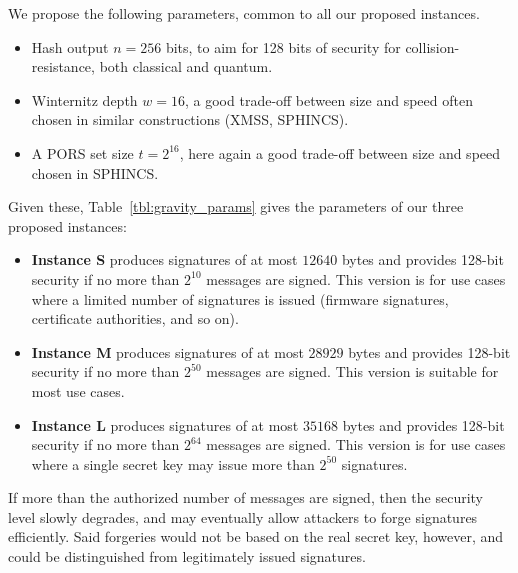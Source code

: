 We propose the following parameters, common to all our proposed instances.
\begin{itemize}
\item Hash output $n = 256$ bits, to aim for 128 bits of security for collision-resistance, both classical and quantum.
\item Winternitz depth $w = 16$, a good trade-off between size and speed often chosen in similar constructions (XMSS, SPHINCS).
\item A PORS set size $t = 2^{16}$, here again a good trade-off between size and speed chosen in SPHINCS.
\end{itemize}
%
Given these, Table~\ref{tbl:gravity_params} gives the parameters of our three proposed instances:
\begin{itemize}
\item \textbf{Instance S} produces signatures of at most $\num{12640}$ bytes and provides 128-bit security if no more than $2^{10}$ messages are signed.
This version is for use cases where a limited number of signatures is issued (firmware signatures, certificate authorities, and so on).

\item \textbf{Instance M} produces signatures of at most $\num{28929}$ bytes and provides 128-bit security if no more than $2^{50}$ messages are signed.
This version is suitable for most use cases.

\item \textbf{Instance L} produces signatures of at most $\num{35168}$ bytes and provides 128-bit security if no more than $2^{64}$ messages are signed.
This version is for use cases where a single secret key may issue more than $2^{50}$ signatures.


\end{itemize}
If more than the authorized number of messages are signed, then the security level slowly degrades, and may eventually allow attackers to forge signatures efficiently.
Said forgeries would not be based on the real secret key, however, and could be distinguished from legitimately issued signatures.


